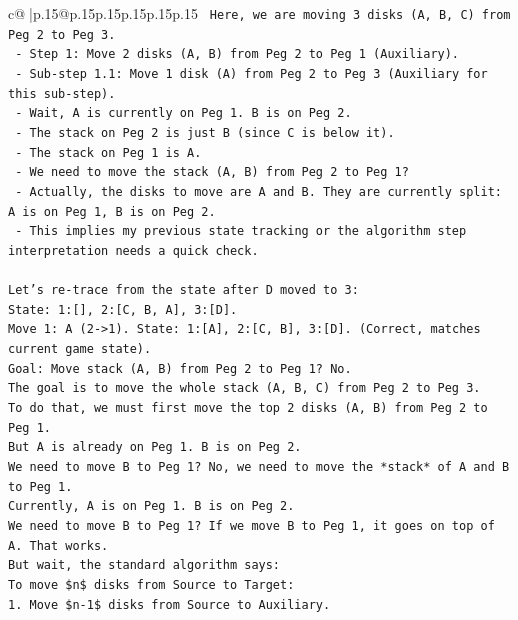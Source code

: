 \documentclass{article}
\begin{document}
{\begin{supertabular}{c@{$\;$}|p{.15\linewidth}@{}p{.15\linewidth}p{.15\linewidth}p{.15\linewidth}p{.15\linewidth}p{.15\linewidth}}
{{{\texttt{   Here, we are moving 3 disks (A, B, C) from Peg 2 to Peg 3.} \\
\texttt{   {-} Step 1: Move 2 disks (A, B) from Peg 2 to Peg 1 (Auxiliary).} \\
\texttt{     {-} Sub{-}step 1.1: Move 1 disk (A) from Peg 2 to Peg 3 (Auxiliary for this sub{-}step).} \\
\texttt{       {-} Wait, A is currently on Peg 1. B is on Peg 2.} \\
\texttt{       {-} The stack on Peg 2 is just B (since C is below it).} \\
\texttt{       {-} The stack on Peg 1 is A.} \\
\texttt{       {-} We need to move the stack (A, B) from Peg 2 to Peg 1?} \\
\texttt{       {-} Actually, the disks to move are A and B. They are currently split: A is on Peg 1, B is on Peg 2.} \\
\texttt{       {-} This implies my previous state tracking or the algorithm step interpretation needs a quick check.} \\
\\ 
\texttt{Let's re{-}trace from the state after D moved to 3:} \\
\texttt{State: 1:{[}{]}, 2:{[}C, B, A{]}, 3:{[}D{]}.} \\
\texttt{Move 1: A (2{-}>1). State: 1:{[}A{]}, 2:{[}C, B{]}, 3:{[}D{]}. (Correct, matches current game state).} \\
\texttt{Goal: Move stack (A, B) from Peg 2 to Peg 1? No.} \\
\texttt{The goal is to move the whole stack (A, B, C) from Peg 2 to Peg 3.} \\
\texttt{To do that, we must first move the top 2 disks (A, B) from Peg 2 to Peg 1.} \\
\texttt{But A is already on Peg 1. B is on Peg 2.} \\
\texttt{We need to move B to Peg 1? No, we need to move the *stack* of A and B to Peg 1.} \\
\texttt{Currently, A is on Peg 1. B is on Peg 2.} \\
\texttt{We need to move B to Peg 1? If we move B to Peg 1, it goes on top of A. That works.} \\
\texttt{But wait, the standard algorithm says:} \\
\texttt{To move \$n\$ disks from Source to Target:} \\
\texttt{1. Move \$n{-}1\$ disks from Source to Auxiliary.} \\
}}}
\end{supertabular}}
\end{document}
